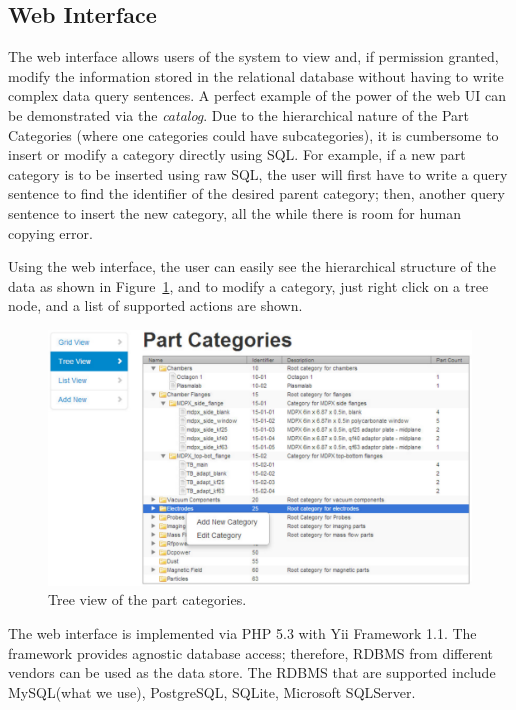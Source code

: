 
\subsection{Web Interface}

The web interface allows users of the system to view and, if permission granted, modify the information stored in the relational database without having to write complex data query sentences. A perfect example of the power of the web UI can be demonstrated via the \emph{catalog}. Due to the hierarchical nature of the Part Categories (where one categories could have subcategories), it is cumbersome to insert or modify a category directly using SQL. For example, if a new part category is to be inserted using raw SQL, the user will first have to write a query sentence to find the identifier of the desired parent category; then, another query sentence to insert the new category, all the while there is room for human copying error.

Using the web interface, the user can easily see the hierarchical structure of the data as shown in Figure~\ref{fig:partcat}, and to modify a category, just right click on a tree node, and a list of supported actions are shown.

\begin{figure}[h!]
\centering
\includegraphics[width=6in]{partcat.pdf}
\caption{Tree view of the part categories.\label{fig:partcat}}
\end{figure}

The web interface is implemented via PHP 5.3 with Yii Framework 1.1. The framework provides agnostic database access; therefore, RDBMS from different vendors can be used as the data store. The RDBMS that are supported include MySQL(what we use), PostgreSQL, SQLite, Microsoft SQLServer.

